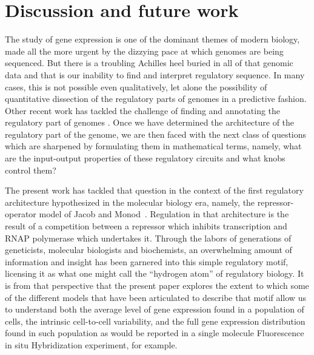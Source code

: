 \section{Discussion and future work}

The study of gene expression is one of the dominant themes of modern biology,
made all the more urgent by the dizzying pace at which genomes are being
sequenced. But there is a troubling Achilles heel buried in all of that genomic
data and that is our inability to find and interpret regulatory sequence. In
many cases, this is not possible even qualitatively, let alone the possibility
of quantitative dissection of the regulatory parts of genomes in a predictive
fashion. Other recent work has tackled the challenge of finding and annotating
the regulatory part of genomes \cite{Belliveau2018, Ireland2020}. Once we have
determined the architecture of the regulatory part of the genome, we are then
faced with the next class of questions which are sharpened by formulating them
in mathematical terms, namely, what are the input-output properties of these
regulatory circuits and what knobs control them?

The present work has tackled that question in the context of the first
regulatory architecture hypothesized in the molecular biology era, namely, the
repressor-operator model of Jacob and Monod~\cite{Jacob1961}. Regulation in that
architecture is the result of a competition between a repressor which inhibits
transcription and RNAP polymerase which undertakes it. Through the labors of
generations of geneticists, molecular biologists and biochemists, an
overwhelming amount of information and insight has been garnered into this
simple regulatory motif, licensing it as what one might call the ``hydrogen
atom'' of regulatory biology. It is from that perspective that the present paper
explores the extent to which some of the different models that have been
articulated to describe that motif allow us to understand both the average level
of gene expression found in a population of cells, the intrinsic cell-to-cell
variability, and the full gene expression distribution found in such population
as would be reported in a single molecule Fluorescence in situ Hybridization
experiment, for example.

